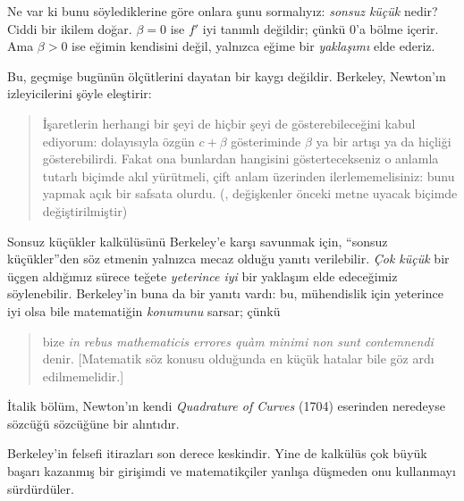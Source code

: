 \documentclass[../../../include/open-logic-section]{subfiles}
\begin{document}
Ne var ki bunu söylediklerine göre onlara şunu sormalıyız: \emph{sonsuz
küçük} nedir? Ciddi bir ikilem doğar. $\beta = 0$ ise $f'$ iyi tanımlı
değildir; çünkü $0$'a bölme içerir. Ama $\beta > 0$ ise eğimin kendisini değil,
yalnızca eğime bir \emph{yaklaşımı} elde ederiz.

Bu, geçmişe bugünün ölçütlerini dayatan bir kaygı değildir. Berkeley,
Newton'ın izleyicilerini şöyle eleştirir:
\begin{quote}
İşaretlerin herhangi bir şeyi de hiçbir şeyi de gösterebileceğini kabul
ediyorum: dolayısıyla özgün $c + \beta$ gösteriminde $\beta$ ya bir artışı ya
da hiçliği gösterebilirdi. Fakat ona bunlardan hangisini göstertecekseniz o
anlamla tutarlı biçimde akıl yürütmeli, çift anlam üzerinden ilerlememelisiniz:
bunu yapmak açık bir safsata olurdu. (\citealt[\S{}XIII]{Berkeley1734},
değişkenler önceki metne uyacak biçimde değiştirilmiştir)
\end{quote}
Sonsuz küçükler kalkülüsünü Berkeley'e karşı savunmak için, ``sonsuz
küçükler''den söz etmenin yalnızca mecaz olduğu yanıtı verilebilir. \emph{Çok
küçük} bir üçgen aldığımız sürece teğete \emph{yeterince iyi} bir yaklaşım
elde edeceğimiz söylenebilir. Berkeley'in buna da bir yanıtı vardı: bu,
mühendislik için yeterince iyi olsa bile matematiğin \emph{konumunu} sarsar;
çünkü
\begin{quote}
bize \emph{in rebus mathematicis errores qu\`{a}m minimi non sunt
contemnendi} denir. [Matematik söz konusu olduğunda en küçük hatalar bile göz
ardı edilmemelidir.] \citep[\S{}IX]{Berkeley1734}
\end{quote}
İtalik bölüm, Newton'ın kendi \emph{Quadrature of Curves} (1704) eserinden
neredeyse sözcüğü sözcüğüne bir alıntıdır.

Berkeley'in felsefi itirazları son derece keskindir. Yine de kalkülüs çok büyük
başarı kazanmış bir girişimdi ve matematikçiler yanlışa düşmeden onu
kullanmayı sürdürdüler.
\end{document}
